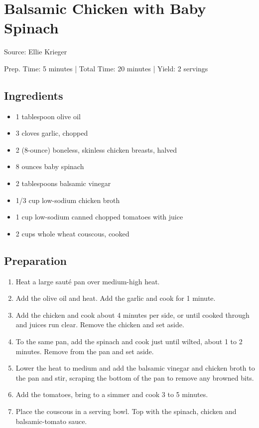 \section{Balsamic Chicken with Baby Spinach}

Source: Ellie Krieger

\begin{center}
Prep. Time: 5 minutes |
Total Time: 20 minutes | 
Yield: 2 servings
\end{center}

\subsection{Ingredients}
\begin{itemize}
    \item 1 tablespoon olive oil
    \item 3 cloves garlic, chopped
    \item 2 (8-ounce) boneless, skinless chicken breasts, halved
    \item 8 ounces baby spinach
    \item 2 tablespoons balsamic vinegar
    \item 1/3 cup low-sodium chicken broth
    \item 1 cup low-sodium canned chopped tomatoes with juice
    \item 2 cups whole wheat couscous, cooked
\end{itemize}

\subsection{Preparation}
\begin{enumerate}
    \item Heat a large saut\'{e} pan over medium-high heat.
    \item Add the olive oil and heat. Add the garlic and cook for 1 minute.
    \item Add the chicken and cook about 4 minutes per side, or until cooked through and juices run clear. Remove the chicken and set aside.
    \item To the same pan, add the spinach and cook just until wilted, about 1 to 2 minutes. Remove from the pan and set aside.
    \item Lower the heat to medium and add the balsamic vinegar and chicken broth to the pan and stir, scraping the bottom of the pan to remove any browned bits.
    \item Add the tomatoes, bring to a simmer and cook 3 to 5 minutes.
    \item Place the couscous in a serving bowl. Top with the spinach, chicken and balsamic-tomato sauce.
\end{enumerate}
